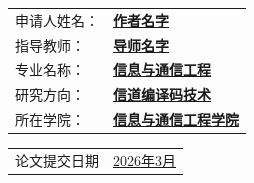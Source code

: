 \vspace{50pt}

\begin{center}
     \songti
    \begin{tabularx}{.6\textwidth}{>{\songti}l >{\songti}X<{\centering}}
        申请人姓名： & \bfseries \uline{\hfill 作者名字 \hfill}        \\
        指导教师：   & \bfseries \uline{\hfill 导师名字 \hfill} \hfill \\
        专业名称：   & \bfseries \uline{\hfill 信息与通信工程 \hfill}                \\
        研究方向：   & \bfseries \uline{\hfill 信道编译码技术 \hfill}              \\
        所在学院：   & \bfseries \uline{\hfill 信息与通信工程学院 \hfill}          \\
    \end{tabularx}
\end{center}

\vspace{40pt}

\begin{center}
     \bfseries
    \begin{tabularx}{.5\textwidth}{>{\songti}l >{\songti}X<{\centering}}
        论文提交日期 & \uline{\hfill 2026年3月 \hfill}
    \end{tabularx}
\end{center}

\restoregeometry
